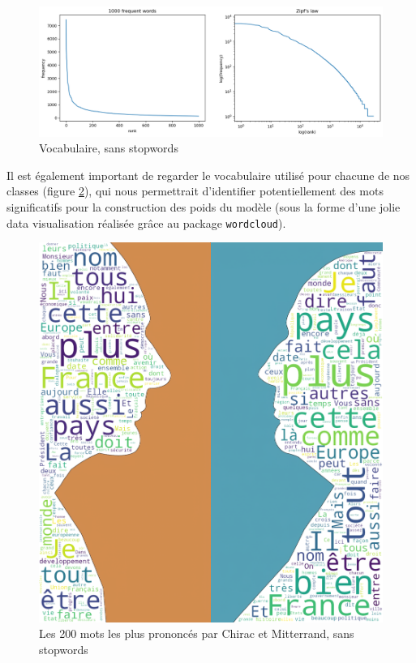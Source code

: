 \documentclass{article}
\begin{document}
\begin{figure}[H]
    \centering
    \includegraphics[width=\textwidth]{./src/locuteur/zipfs_stopwords.png} 
    \caption{Vocabulaire, sans stopwords}
    \label{zipfs_stopwords_pres}
\end{figure}


Il est également important de regarder le vocabulaire utilisé pour chacune de nos classes (figure \ref{president_dataviz}), qui nous permettrait d'identifier potentiellement des mots significatifs pour la construction des poids du modèle (sous la forme d'une jolie data visualisation réalisée grâce au package \texttt{wordcloud}). 

\begin{figure}[!htpb]
    \centering
    \includegraphics[width=\textwidth]{./src/locuteur/president_dataviz.png} 
    \caption{Les 200 mots les plus prononcés par Chirac et Mitterrand, sans stopwords}
    \label{president_dataviz}
\end{figure}
\end{document}
